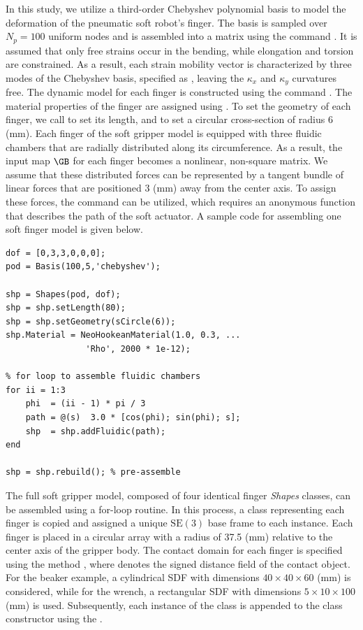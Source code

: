 In this study, we utilize a third-order Chebyshev polynomial basis to model the deformation of the pneumatic soft robot's finger. The basis is sampled over $N_p = 100$ uniform nodes and is assembled into a matrix using the command . It is assumed that only free strains occur in the bending, while elongation and torsion are constrained. As a result, each strain mobility vector is characterized by three modes of the Chebyshev basis, specified as , leaving the $\kappa_x$ and $\kappa_y$ curvatures free. The dynamic model for each finger is constructed using the command . The material properties of the finger are assigned using . To set the geometry of each finger, we call  to set its length, and  to set a circular cross-section of radius $6$ (mm). Each finger of the soft gripper model is equipped with three fluidic chambers that are radially distributed along its circumference. As a result, the input map $\GB$ for each finger becomes a nonlinear, non-square matrix. We assume that these distributed forces can be represented by a tangent bundle of linear forces that are positioned $3$ (mm) away from the center axis. To assign these forces, the  command can be utilized, which requires an anonymous function  that describes the path of the soft actuator. A sample code for assembling one soft finger model is given below.

\begin{lstlisting}[style=matlab] 
dof = [0,3,3,0,0,0];
pod = Basis(100,5,'chebyshev');

shp = Shapes(pod, dof);
shp = shp.setLength(80);
shp = shp.setGeometry(sCircle(6));
shp.Material = NeoHookeanMaterial(1.0, 0.3, ... 
                'Rho', 2000 * 1e-12);

% for loop to assemble fluidic chambers
for ii = 1:3
    phi  = (ii - 1) * pi / 3
    path = @(s)  3.0 * [cos(phi); sin(phi); s];
    shp  = shp.addFluidic(path); 
end

shp = shp.rebuild(); % pre-assemble
\end{lstlisting}

The full soft gripper model, composed of four identical finger \textit{Shapes} classes, can be assembled using a for-loop routine. In this process, a class representing each finger is copied and assigned a unique $\textrm{SE}(3)$ base frame to each instance. Each finger is placed in a circular array with a radius of 37.5 (mm) relative to the center axis of the gripper body. The contact domain for each finger is specified using the method , where  denotes the signed distance field of the contact object. For the beaker example, a cylindrical SDF with dimensions $40 \times 40 \times 60$ (mm) is considered, while for the wrench, a rectangular SDF with dimensions $5 \times 10 \times 100$ (mm) is used. Subsequently, each instance of the  class is appended to the  class constructor using the .

